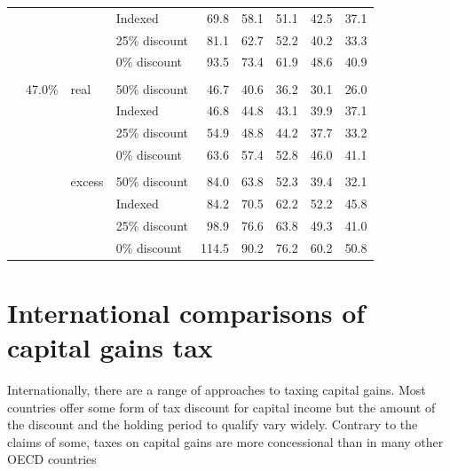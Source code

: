 \begin{subappendices}
\begin{table}
{\begin{tabular}{Qlllrrrrr}
   &  &  & Indexed & 69.8 & 58.1 & 51.1 & 42.5 & 37.1 \\ 
   &  &  & 25\% discount & 81.1 & 62.7 & 52.2 & 40.2 & 33.3 \\ 
   &  &  & 0\% discount & 93.5 & 73.4 & 61.9 & 48.6 & 40.9 \\ 
  &\phantom{.}\\[-6pt] & 47.0\% & real & 50\% discount & 46.7 & 40.6 & 36.2 & 30.1 & 26.0 \\ 
   &  &  & Indexed & 46.8 & 44.8 & 43.1 & 39.9 & 37.1 \\ 
   &  &  & 25\% discount & 54.9 & 48.8 & 44.2 & 37.7 & 33.2 \\ 
   &  &  & 0\% discount & 63.6 & 57.4 & 52.8 & 46.0 & 41.1 \\ 
  &\phantom{.}\\[-9pt] &  & excess & 50\% discount & 84.0 & 63.8 & 52.3 & 39.4 & 32.1 \\ 
   &  &  & Indexed & 84.2 & 70.5 & 62.2 & 52.2 & 45.8 \\ 
   &  &  & 25\% discount & 98.9 & 76.6 & 63.8 & 49.3 & 41.0 \\ 
   &  &  & 0\% discount & 114.5 & 90.2 & 76.2 & 60.2 & 50.8 \\ 
   \bottomrule
\end{tabular}}

\end{table}











\renewcommand{\arraystretch}{1.0}
\normalsize

\chapter{International comparisons of capital gains tax}\label{appendix:Intl-comparisons-of-CGT}
Internationally, there are a range of approaches to taxing capital gains. Most countries offer some form of tax discount for capital income but the amount of the discount and the holding period to qualify vary widely. Contrary to the claims of some, taxes on capital gains are more concessional than in many other OECD countries 


\end{subappendices}
